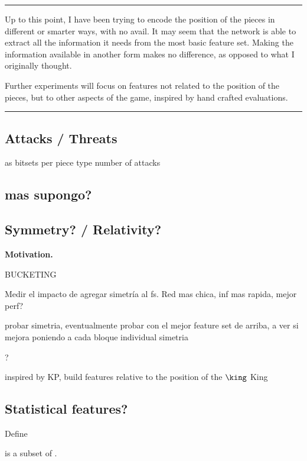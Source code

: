 \noindent\rule{\textwidth}{1pt}

\vspace{0.2cm}
Up to this point, I have been trying to encode the position of the pieces in different or smarter ways, with no avail. It may seem that the network is able to extract all the information it needs from the most basic  feature set. Making the information available in another form makes no difference, as opposed to what I originally thought.

Further experiments will focus on features not related to the position of the pieces, but to other aspects of the game, inspired by hand crafted evaluations.

\noindent\rule{\textwidth}{1pt}



\subsection{Attacks / Threats}

as bitsets per piece type
number of attacks

\subsection{mas supongo?}

\subsection{Symmetry? / Relativity?}

\textbf{Motivation.}

BUCKETING

Medir el impacto de agregar simetría al fs. Red mas chica, inf mas rapida, mejor perf?

probar simetria, eventualmente probar con el mejor feature set de arriba, a ver si mejora poniendo a cada bloque individual simetria

?

inspired by KP, build features relative to the position of the $\king$ King

\subsection{Statistical features?}

Define 

 is a subset of .

